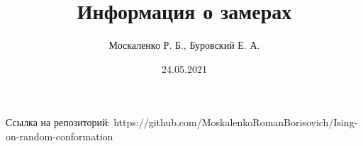 \documentclass[a4paper,12pt]{article}
\title{Информация о замерах}
\author{Москаленко Р. Б., Буровский Е. А.}
\date{24.05.2021}
\begin{document}
\maketitle

%





%



\begin{thebibliography}{9}
 Ссылка на репозиторий: https://github.com/MoskalenkoRomanBorisovich/Ising-on-random-conformation 
\end{thebibliography}
\end{document}
